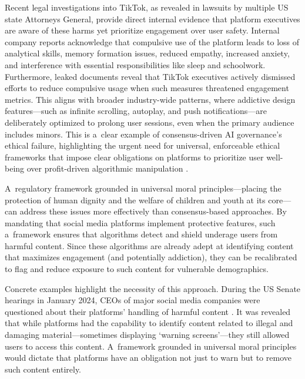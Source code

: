 \documentclass[%
  manuscript=article,
  year=2024,
  volume=77,
  doi=10.59203/zfn.77.707,
]{zfn}
\begin{document}
Recent legal investigations into TikTok, as revealed in lawsuits by multiple US state Attorneys General, provide direct internal evidence that platform executives are aware of these harms yet prioritize engagement over user safety. Internal company reports acknowledge that compulsive use of the platform leads to loss of analytical skills, memory formation issues, reduced empathy, increased anxiety, and interference with essential responsibilities like sleep and schoolwork. Furthermore, leaked documents reveal that TikTok executives actively dismissed efforts to reduce compulsive usage when such measures threatened engagement metrics. This aligns with broader industry-wide patterns, where addictive design features---such as infinite scrolling, autoplay, and push notifications---are deliberately optimized to prolong user sessions, even when the primary audience includes minors. This is a~clear example of consensus-driven AI governance's ethical failure, highlighting the urgent need for universal, enforceable ethical frameworks that impose clear obligations on platforms to prioritize user well-being over profit-driven algorithmic manipulation 
\parencite[][]{haidt_tiktok_2025}.%




A~regulatory framework grounded in universal moral principles---placing the protection of human dignity and the welfare of children and youth at its core---can address these issues more effectively than consensus-based approaches. By mandating that social media platforms implement protective features, such a~framework ensures that algorithms detect and shield underage users from harmful content. Since these algorithms are already adept at identifying content that maximizes engagement (and potentially addiction), they can be recalibrated to flag and reduce exposure to such content for vulnerable demographics.



Concrete examples highlight the necessity of this approach. During the US Senate hearings in January 2024, CEOs of major social media companies were questioned about their platforms' handling of harmful content 
\parencite[][]{ortutay_meta_2024}. %
 It was revealed that while platforms had the capability to identify content related to illegal and damaging material---sometimes displaying `warning screens'---they still allowed users to access this content. A~framework grounded in universal moral principles would dictate that platforms have an obligation not just to warn but to remove such content entirely.
\end{document}
